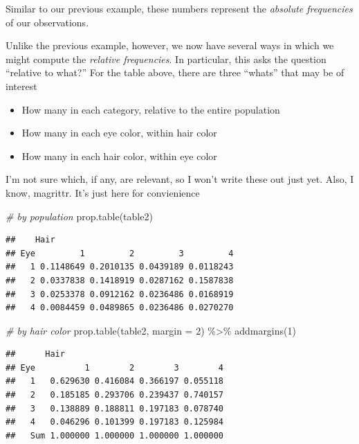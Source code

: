 \documentclass[
]{book}
\newenvironment{Shaded}{\begin{snugshade}}{\end{snugshade}}
\newcommand{\AttributeTok}[1]{\textcolor[rgb]{0.77,0.63,0.00}{#1}}
\newcommand{\CommentTok}[1]{\textcolor[rgb]{0.56,0.35,0.01}{\textit{#1}}}
\newcommand{\DecValTok}[1]{\textcolor[rgb]{0.00,0.00,0.81}{#1}}
\newcommand{\FunctionTok}[1]{\textcolor[rgb]{0.00,0.00,0.00}{#1}}
\newcommand{\NormalTok}[1]{#1}
\newcommand{\SpecialCharTok}[1]{\textcolor[rgb]{0.00,0.00,0.00}{#1}}
\providecommand{\tightlist}{%
  \setlength{\itemsep}{0pt}\setlength{\parskip}{0pt}}
\theoremstyle{definition}
\theoremstyle{definition}
\theoremstyle{definition}
\theoremstyle{remark}
\begin{document}
Similar to our previous example, these numbers represent the \emph{absolute frequencies} of our observations.

Unlike the previous example, however, we now have several ways in which we might compute the \emph{relative frequencies}. In particular, this asks the question ``relative to what?'' For the table above, there are three ``whats'' that may be of interest

\begin{itemize}
\tightlist
\item
  How many in each category, relative to the entire population
\item
  How many in each eye color, within hair color
\item
  How many in each hair color, within eye color
\end{itemize}

I'm not sure which, if any, are relevant, so I won't write these out just yet. Also, I know, magrittr. It's just here for convienience

\begin{Shaded}
\begin{Highlighting}[]
\CommentTok{\# by population}
\FunctionTok{prop.table}\NormalTok{(table2)}
\end{Highlighting}
\end{Shaded}

\begin{verbatim}
##    Hair
## Eye         1         2         3         4
##   1 0.1148649 0.2010135 0.0439189 0.0118243
##   2 0.0337838 0.1418919 0.0287162 0.1587838
##   3 0.0253378 0.0912162 0.0236486 0.0168919
##   4 0.0084459 0.0489865 0.0236486 0.0270270
\end{verbatim}

\begin{Shaded}
\begin{Highlighting}[]
\CommentTok{\# by hair color}
\FunctionTok{prop.table}\NormalTok{(table2, }\AttributeTok{margin =} \DecValTok{2}\NormalTok{) }\SpecialCharTok{\%\textgreater{}\%} \FunctionTok{addmargins}\NormalTok{(}\DecValTok{1}\NormalTok{)}
\end{Highlighting}
\end{Shaded}

\begin{verbatim}
##      Hair
## Eye          1        2        3        4
##   1   0.629630 0.416084 0.366197 0.055118
##   2   0.185185 0.293706 0.239437 0.740157
##   3   0.138889 0.188811 0.197183 0.078740
##   4   0.046296 0.101399 0.197183 0.125984
##   Sum 1.000000 1.000000 1.000000 1.000000
\end{verbatim}
\end{document}
